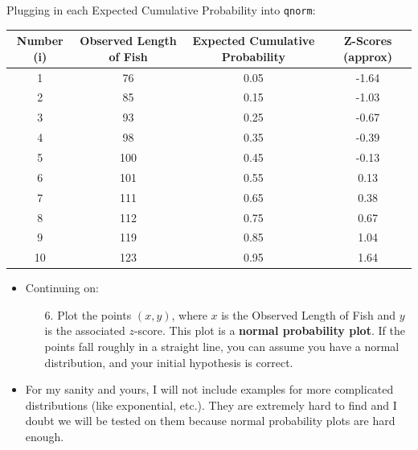 \documentclass[12pt]{article}
\begin{document}
Plugging in each Expected Cumulative Probability into \verb|qnorm|:
\begin{center}
	\begin{tabular}{c | c | c | c}
		Number (i) & Observed Length of Fish & Expected Cumulative Probability & Z-Scores (approx) \\
		\hline
		1          & 76                      & 0.05                            & -1.64             \\
		2          & 85                      & 0.15                            & -1.03             \\
		3          & 93                      & 0.25                            & -0.67             \\
		4          & 98                      & 0.35                            & -0.39             \\
		5          & 100                     & 0.45                            & -0.13             \\
		6          & 101                     & 0.55                            & 0.13              \\
		7          & 111                     & 0.65                            & 0.38              \\
		8          & 112                     & 0.75                            & 0.67              \\
		9          & 119                     & 0.85                            & 1.04              \\
		10         & 123                     & 0.95                            & 1.64
	\end{tabular}
\end{center}
\begin{itemize}
	\item Continuing on:
	      \begin{enumerate}
		      \item[6.] Plot the points $(x, y)$, where $x$ is the Observed Length of Fish and $y$ is the associated $z$-score.
			      This plot is a \textbf{normal probability plot}. If the points fall roughly in a straight line, you can
			      assume you have a normal distribution, and your initial hypothesis is correct.
	      \end{enumerate}
	\item For my sanity and yours, I will not include examples for more complicated
	      distributions (like exponential, etc.). They are extremely hard to find
	      and I doubt we will be tested on them because normal probability plots
	      are hard enough.
\end{itemize}
\end{document}
